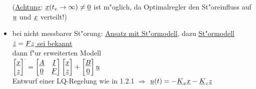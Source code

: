 \documentclass[openany,a4paper,11pt]{book}
\begin{document}
\begin{itemize}
    (\uline{Achtung}: $\uline{x}(t_e\rightarrow\infty)\neq\uline{0}$ ist m"oglich, da Optimalregler den St"oreinfluss auf $\uline{u}$ und $\uline{x}$ verteilt!)
    \item bei nicht messbarer St"orung: \uline{Ansatz mit St"ormodell}, dazu \uline{St"ormodell $\uline{\dot{z}}=\uline{Fz}$ sei bekannt}\\
    dann f"ur erweiterten Modell\\[2pt]
    $\begin{bmatrix} \uline{x}\\\uline{z}\end{bmatrix}^{\cdot} = 
    \begin{bmatrix} \uline{A} & \uline{I}\\\uline{0} & \uline{F}\end{bmatrix} \begin{bmatrix} \uline{x}\\ \uline{z} \end{bmatrix}+ \begin{bmatrix} \uline{B}\\ \uline{0} \end{bmatrix}\uline{u}$\\[2pt]
    Entwurf einer LQ-Regelung wie in 1.2.1 $\Rightarrow$ $\uline{u}(t)=-\uline{K}_x\uline{x}-\uline{K}_z\uline{z}$
\end{itemize}
\clearpage
\end{document}

